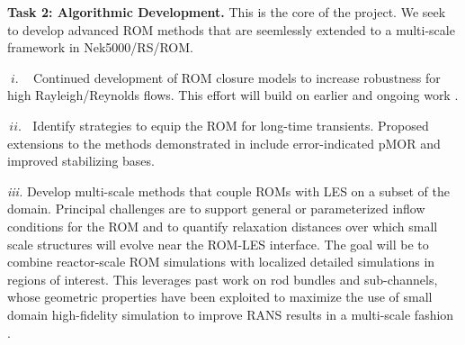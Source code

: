 

\noindent
\textbf{Task 2: Algorithmic Development.} This is the core of the project.
We seek to develop advanced ROM methods that are seemlessly
extended to a multi-scale framework in Nek5000/RS/ROM.
\\[-3ex]
\begin{description}
\item{$\; i. \; \; \;$}
Continued development of ROM closure models to increase robustness 
for high Rayleigh/Reynolds flows.  This effort will build on earlier and 
ongoing work
\cite{kaneko22a,kaneko22,tsai22a,kaneko20a,mou2021}.
\\[-3ex]
\item{$\, ii. \;\;$}
Identify strategies to equip the ROM for long-time transients.  
Proposed extensions to the methods demonstrated in \cite{kaneko20a}
include error-indicated pMOR and improved stabilizing bases.
\\[-3ex]
\item{\em iii. \;}Develop multi-scale methods that couple ROMs with LES on a 
subset of the
domain.  Principal challenges are to support general or parameterized inflow
conditions for the ROM and to quantify relaxation distances over which small
scale structures will evolve near the ROM-LES interface. The goal will be to
combine reactor-scale ROM simulations with localized detailed simulations in
regions of interest. This leverages past work on rod bundles and sub-channels,
whose geometric properties have been exploited to maximize the use of small
domain high-fidelity simulation to improve RANS results in a multi-scale
fashion \cite{martinez2019a}.  
\\[-2ex]
\end{description}%

